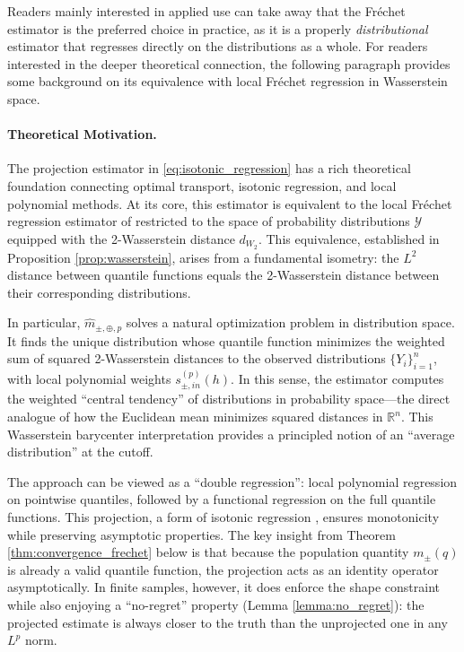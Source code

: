 \documentclass[12pt]{article}
\begin{document}
Readers mainly interested in applied use can take away that the Fr\'echet estimator is the preferred choice in practice, as it is a properly \textit{distributional} estimator that regresses directly on the distributions as a whole. For readers interested in the deeper theoretical connection, the following paragraph provides some background on its equivalence with local Fr\'echet regression in Wasserstein space.

\paragraph*{Theoretical Motivation.}


The projection estimator in \eqref{eq:isotonic_regression} has a rich theoretical foundation connecting optimal transport, isotonic regression, and local polynomial methods. At its core, this estimator is equivalent to the local Fr\'echet regression estimator of \citet{petersen2019frechet} restricted to the space of probability distributions $\mathcal{Y}$ equipped with the 2-Wasserstein distance $d_{W_2}$. This equivalence, established in Proposition \ref{prop:wasserstein}, arises from a fundamental isometry: the $L^2$ distance between quantile functions equals the 2-Wasserstein distance between their corresponding distributions.

In particular, $\hat{m}_{\pm, \oplus, p}$ solves a natural optimization problem in distribution space. It finds the unique distribution whose quantile function minimizes the weighted sum of squared 2-Wasserstein distances to the observed distributions $\{Y_i\}_{i=1}^n$, with local polynomial weights $s^{(p)}_{\pm,in}(h)$. In this sense, the estimator computes the weighted ``central tendency'' of distributions in probability space---the direct analogue of how the Euclidean mean minimizes squared distances in $\mathbb{R}^n$. This Wasserstein barycenter interpretation \citep{agueh2011barycenters, fan2024conditional} provides a principled notion of an ``average distribution'' at the cutoff.

The approach can be viewed as a ``double regression'': local polynomial regression on pointwise quantiles, followed by a functional regression on the full quantile functions. This projection, a form of isotonic regression \citep{Robertson1988}, ensures monotonicity while preserving asymptotic properties. The key insight from Theorem \ref{thm:convergence_frechet} below is that because the population quantity $m_{\pm}(q)$ is already a valid quantile function, the projection acts as an identity operator asymptotically. In finite samples, however, it does enforce the shape constraint while also enjoying a ``no-regret'' property (Lemma \ref{lemma:no_regret}): the projected estimate is always closer to the truth than the unprojected one in any $L^p$ norm. 
\end{document}
